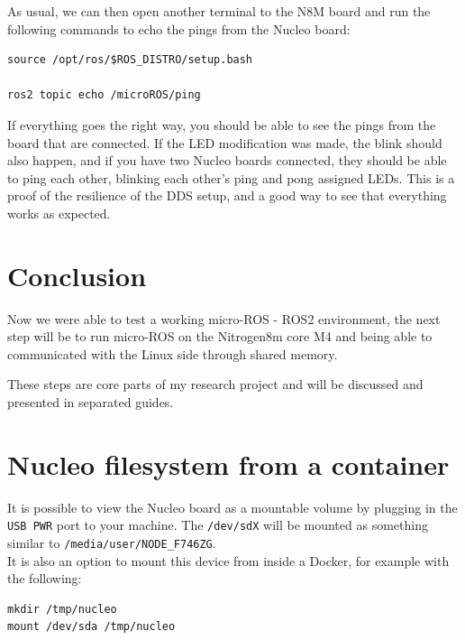 \documentclass[10pt]{article}
\begin{document}
As usual, we can then open another terminal to the N8M board and run the following commands to echo the pings from the Nucleo board:
\begin{tcolorbox}
\begin{verbatim}
source /opt/ros/$ROS_DISTRO/setup.bash

ros2 topic echo /microROS/ping
\end{verbatim}
\end{tcolorbox}

If everything goes the right way, you should be able to see the pings from the board that are connected. If the LED modification was made, the blink should also happen, and if you have two Nucleo boards connected, they should be able to ping each other, blinking each other's ping and pong assigned LEDs. This is a proof of the resilience of the DDS setup, and a good way to see that everything works as expected.

\section{Conclusion}
\label{sec:conclusion}
Now we were able to test a working micro-ROS - ROS2 environment, the next step will be to run micro-ROS on the Nitrogen8m core M4 and being able to communicated with the Linux side through shared memory.

These steps are core parts of my research project and will be discussed and presented in separated guides.


\pagebreak
\appendix
\section{Nucleo filesystem from a container}
\label{appendix:nucl-filesyst-from}
It is possible to view the Nucleo board as a mountable volume by plugging in the \verb|USB PWR| port to your machine. The \verb|/dev/sdX| will be mounted as something similar to \verb|/media/user/NODE_F746ZG|.\\
It is also an option to mount this device from inside a Docker, for example with the following:
\begin{tcolorbox}
\begin{verbatim}
mkdir /tmp/nucleo
mount /dev/sda /tmp/nucleo
\end{verbatim}
\end{tcolorbox}
\end{document}
